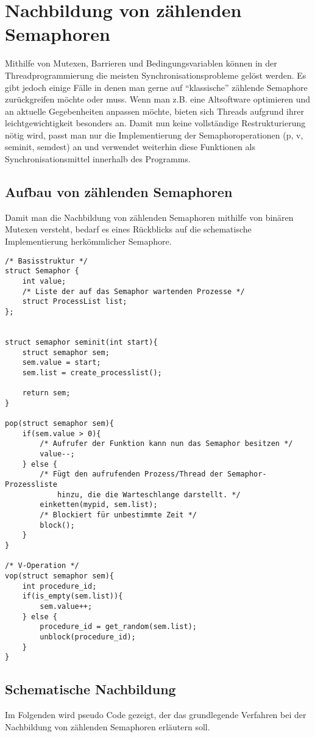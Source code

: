 \documentclass[11pt,a4paper]{article}
\begin{document}
\section{Nachbildung von zählenden Semaphoren}
Mithilfe von Mutexen, Barrieren und Bedingungsvariablen können in der Threadprogrammierung die meisten Synchronisationsprobleme
gelöst werden. Es gibt jedoch einige Fälle in denen man gerne auf ``klassische'' zählende Semaphore zurückgreifen möchte oder muss.
Wenn man z.B. eine Altsoftware optimieren und an aktuelle Gegebenheiten anpassen möchte, bieten sich Threads aufgrund ihrer 
leichtgewichtigkeit besonders an. Damit nun keine vollständige Restrukturierung nötig wird, passt man nur die Implementierung
der Semaphoroperationen (p, v, seminit, semdest) an und verwendet weiterhin diese Funktionen als Synchronisationsmittel innerhalb
des Programms.

\subsection{Aufbau von zählenden Semaphoren}
Damit man die Nachbildung von zählenden Semaphoren mithilfe von binären Mutexen versteht, bedarf es eines Rückblicks auf die
schematische Implementierung herkömmlicher Semaphore. 

\begin{lstlisting}
/* Basisstruktur */
struct Semaphor { 
	int value;
	/* Liste der auf das Semaphor wartenden Prozesse */
	struct ProcessList list; 
};


struct semaphor seminit(int start){
	struct semaphor sem;
	sem.value = start;
	sem.list = create_processlist();

	return sem;
}

pop(struct semaphor sem){
	if(sem.value > 0){
		/* Aufrufer der Funktion kann nun das Semaphor besitzen */
		value--;
	} else {
		/* Fügt den aufrufenden Prozess/Thread der Semaphor-Prozessliste
			hinzu, die die Warteschlange darstellt. */
		einketten(mypid, sem.list);
		/* Blockiert für unbestimmte Zeit */
		block(); 
	}
}

/* V-Operation */
vop(struct semaphor sem){
	int procedure_id;
	if(is_empty(sem.list)){
		sem.value++;
	} else {
		procedure_id = get_random(sem.list);
		unblock(procedure_id);
	}
}
\end{lstlisting}

\subsection{Schematische Nachbildung}
Im Folgenden wird pseudo Code gezeigt, der das grundlegende Verfahren bei der
Nachbildung von zählenden Semaphoren erläutern soll.
\end{document}
